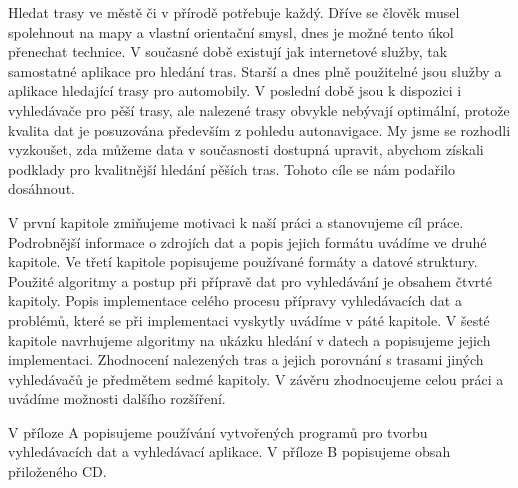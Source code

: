 
%
%

Hledat trasy ve městě či v přírodě potřebuje každý. Dříve se člověk musel
spolehnout na mapy a vlastní orientační smysl, dnes je možné tento úkol
přenechat technice. V současné době existují jak internetové služby, tak
samostatné aplikace pro hledání tras. Starší a dnes plně použitelné jsou služby a
aplikace hledající trasy pro automobily. V poslední době jsou k dispozici i
vyhledávače pro pěší trasy, ale nalezené trasy obvykle nebývají optimální,
protože kvalita dat je posuzována především z pohledu autonavigace. My jsme se
rozhodli vyzkoušet, zda můžeme data v současnosti dostupná upravit, abychom
získali podklady pro kvalitnější hledání pěších tras. Tohoto cíle se nám
podařilo dosáhnout. 

V první kapitole zmiňujeme motivaci k naší práci a stanovujeme cíl práce.
Podrobnější informace o zdrojích dat a popis jejich formátu uvádíme ve druhé
kapitole. Ve třetí kapitole popisujeme používané formáty a datové struktury.
Použité algoritmy a postup při přípravě dat pro vyhledávání je obsahem čtvrté
kapitoly. Popis implementace celého procesu přípravy vyhledávacích dat a
problémů, které se při implementaci vyskytly uvádíme v páté kapitole. V šesté
kapitole navrhujeme algoritmy na ukázku hledání v datech a popisujeme jejich
implementaci. Zhodnocení nalezených tras a jejich porovnání s trasami jiných
vyhledávačů je předmětem sedmé kapitoly. V závěru zhodnocujeme celou práci a
uvádíme možnosti dalšího rozšíření.

V příloze A popisujeme používání vytvořených programů pro tvorbu vyhledávacích
dat a vyhledávací aplikace. V příloze B popisujeme obsah přiloženého CD.



